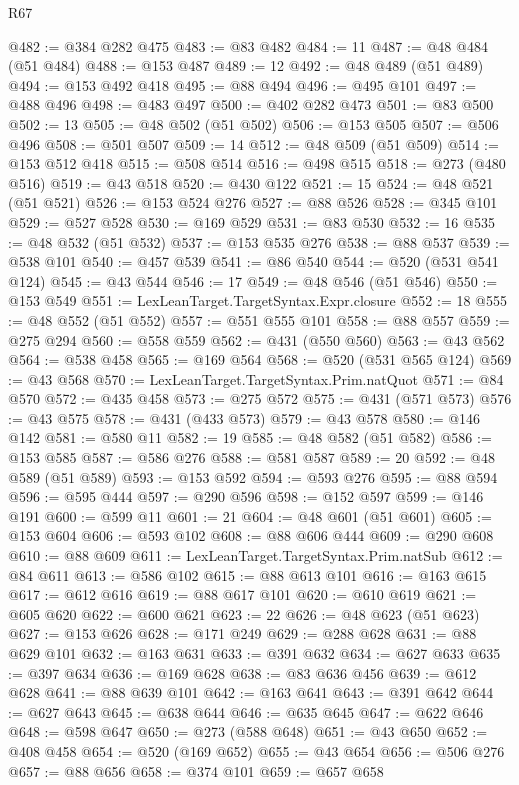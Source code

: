\begin{lexlean}{R67}
\begin{coremodule}
@482 := @384 @282 @475
@483 := @83 @482
@484 := 11
@487 := @48 @484 (@51 @484)
@488 := @153 @487
@489 := 12
@492 := @48 @489 (@51 @489)
@494 := @153 @492 @418
@495 := @88 @494
@496 := @495 @101
@497 := @488 @496
@498 := @483 @497
@500 := @402 @282 @473
@501 := @83 @500
@502 := 13
@505 := @48 @502 (@51 @502)
@506 := @153 @505
@507 := @506 @496
@508 := @501 @507
@509 := 14
@512 := @48 @509 (@51 @509)
@514 := @153 @512 @418
@515 := @508 @514
@516 := @498 @515
@518 := @273 (@480 @516)
@519 := @43 @518
@520 := @430 @122
@521 := 15
@524 := @48 @521 (@51 @521)
@526 := @153 @524 @276
@527 := @88 @526
@528 := @345 @101
@529 := @527 @528
@530 := @169 @529
@531 := @83 @530
@532 := 16
@535 := @48 @532 (@51 @532)
@537 := @153 @535 @276
@538 := @88 @537
@539 := @538 @101
@540 := @457 @539
@541 := @86 @540
@544 := @520 (@531 @541 @124)
@545 := @43 @544
@546 := 17
@549 := @48 @546 (@51 @546)
@550 := @153 @549
@551 := LexLeanTarget.TargetSyntax.Expr.closure
@552 := 18
@555 := @48 @552 (@51 @552)
@557 := @551 @555 @101
@558 := @88 @557
@559 := @275 @294
@560 := @558 @559
@562 := @431 (@550 @560)
@563 := @43 @562
@564 := @538 @458
@565 := @169 @564
@568 := @520 (@531 @565 @124)
@569 := @43 @568
@570 := LexLeanTarget.TargetSyntax.Prim.natQuot
@571 := @84 @570
@572 := @435 @458
@573 := @275 @572
@575 := @431 (@571 @573)
@576 := @43 @575
@578 := @431 (@433 @573)
@579 := @43 @578
@580 := @146 @142
@581 := @580 @11
@582 := 19
@585 := @48 @582 (@51 @582)
@586 := @153 @585
@587 := @586 @276
@588 := @581 @587
@589 := 20
@592 := @48 @589 (@51 @589)
@593 := @153 @592
@594 := @593 @276
@595 := @88 @594
@596 := @595 @444
@597 := @290 @596
@598 := @152 @597
@599 := @146 @191
@600 := @599 @11
@601 := 21
@604 := @48 @601 (@51 @601)
@605 := @153 @604
@606 := @593 @102
@608 := @88 @606 @444
@609 := @290 @608
@610 := @88 @609
@611 := LexLeanTarget.TargetSyntax.Prim.natSub
@612 := @84 @611
@613 := @586 @102
@615 := @88 @613 @101
@616 := @163 @615
@617 := @612 @616
@619 := @88 @617 @101
@620 := @610 @619
@621 := @605 @620
@622 := @600 @621
@623 := 22
@626 := @48 @623 (@51 @623)
@627 := @153 @626
@628 := @171 @249
@629 := @288 @628
@631 := @88 @629 @101
@632 := @163 @631
@633 := @391 @632
@634 := @627 @633
@635 := @397 @634
@636 := @169 @628
@638 := @83 @636 @456
@639 := @612 @628
@641 := @88 @639 @101
@642 := @163 @641
@643 := @391 @642
@644 := @627 @643
@645 := @638 @644
@646 := @635 @645
@647 := @622 @646
@648 := @598 @647
@650 := @273 (@588 @648)
@651 := @43 @650
@652 := @408 @458
@654 := @520 (@169 @652)
@655 := @43 @654
@656 := @506 @276
@657 := @88 @656
@658 := @374 @101
@659 := @657 @658

\end{coremodule}
\end{lexlean}
